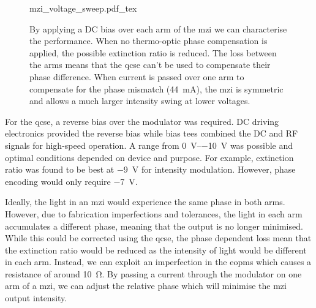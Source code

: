 \begin{figure}[t]
	\centering
	\def\svgwidth{\textwidth} 
	{mzi_voltage_sweep.pdf_tex}
	\caption[MZI calibration through thermo-optic modulation]{By applying a DC bias over each arm of the \ac{mzi} we can characterise the performance. When no thermo-optic phase compensation is applied, the possible extinction ratio is reduced. The loss between the arms means that the \ac{qcse} can't be used to compensate their phase difference. When current is passed over one arm to compensate for the phase mismatch (\SI{44}{\mA}), the \acs{mzi} is symmetric and allows a much larger intensity swing at lower voltages.}
	\label{fig:mzi_cal}
\end{figure}

For the \ac{qcse}, a reverse bias over the modulator was required. DC driving electronics provided the reverse bias while bias tees combined the DC and RF signals for high-speed operation. A range from \SIrange{0}{-10}{\V} was possible and optimal conditions depended on device and purpose. For example, extinction ratio was found to be best at \SI{-9}{\V} for intensity modulation. However, phase encoding would only require \SI{-7}{\V}.





Ideally, the light in an \ac{mzi} would experience the same phase in both arms. However, due to fabrication imperfections and tolerances, the light in each arm accumulates a different phase, meaning that the output is no longer minimised. While this could be corrected using the \ac{qcse}, the phase dependent loss mean that the extinction ratio would be reduced as the intensity of light would be different in each arm. Instead, we can exploit an imperfection in the \acp{eopm} which causes a resistance of around \SI{10}{\ohm}. By passing a current through the modulator on one arm of a \ac{mzi}, we can adjust the relative phase which will minimise the \ac{mzi} output intensity.

